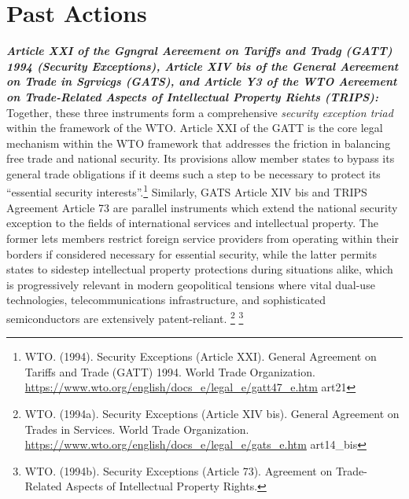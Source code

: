 \section{Past Actions}

\emph{\textbf{Article XXI of the Ggngral Aereement on Tariffs and Tradg (GATT) 1994 (Security Exceptions), Article XIV bis of the General Aereement on Trade in Sgrvicgs (GATS), and Article Y3 of the WTO Aereement on Trade-Related Aspects of Intellectual Property Riehts (TRIPS):}} Together, these three instruments form a comprehensive \emph{security exception triad} within the framework of the WTO. Article XXI of the GATT is the core legal mechanism within the WTO framework that addresses the friction in balancing free trade and national security. Its provisions allow member states to bypass its general trade obligations if it deems such a step to be necessary to protect its “essential security interests”.\footnote{WTO. (1994). Security Exceptions (Article XXI). General Agreement on Tariffs and Trade (GATT) 1994. World Trade Organization. \url{https://www.wto.org/english/docs_e/legal_e/gatt47_e.htm} art21} Similarly, GATS Article XIV bis and TRIPS Agreement Article 73 are parallel instruments which extend the national security exception to the fields of international services and intellectual property. The former lets members restrict foreign service providers from operating within their borders if considered necessary for essential security, while the latter permits states to sidestep intellectual property protections during situations alike, which is progressively relevant in modern geopolitical tensions where vital dual-use technologies, telecommunications infrastructure, and sophisticated semiconductors are extensively patent-reliant. \footnote{WTO. (1994a). Security Exceptions (Article XIV bis). General Agreement on Trades in Services. World Trade Organization. \url{https://www.wto.org/english/docs_e/legal_e/gats_e.htm} art14\_bis} \footnote{WTO. (1994b). Security Exceptions (Article 73). Agreement on Trade-Related Aspects of Intellectual Property Rights.}

